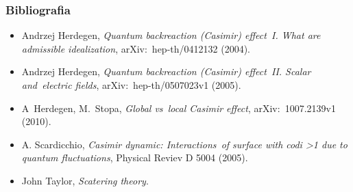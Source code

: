 \documentclass[10pt,t]{beamer}
\begin{document}
\begin{frame}
  \frametitle{Bibliografia}


  \begin{itemize}
    \RaggedRight

  \item Andrzej Herdegen, \textit{Quantum backreaction (Casimir) effect~I.
      What are admissible idealization}, arXiv:~hep-th/0412132 (2004).

  \item Andrzej Herdegen, \textit{Quantum backreaction (Casimir) effect~II.
      Scalar and~electric fields}, arXiv:~hep-th/0507023v1 (2005).

  \item A~Herdegen, M.~Stopa, \textit{Global vs~local Casimir effect},
    arXiv:~1007.2139v1 (2010).

  \item A. Scardicchio, \textit{Casimir dynamic: Interactions~of
      surface with codi >1 due to quantum fluctuations}, Physical
    Reviev D 5004 (2005).

  \item John Taylor, \textit{Scatering theory}.

  \end{itemize}

\end{frame}






\end{document}

